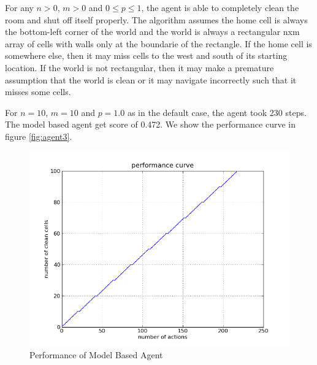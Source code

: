 For any $n>0$, $m>0$ and $0\le p \le1$, the agent is able to completely clean the room and shut off itself properly. The algorithm assumes the home cell is always the bottom-left corner of the world and the world is always a rectangular nxm array of cells with walls only at the boundarie of the rectangle. If the home cell is somewhere else, then it may miss cells to the west and south of its starting location. If the world is not rectangular, then it may make a premature assumption that the world is clean or it may navigate incorrectly such that it misses some cells.

For $n=10$, $m=10$ and $p=1.0$ as in the default case, the agent took 230 steps. The model based agent get score of 0.472. We show the performance curve in figure \ref{fig:agent3}.

\begin{figure}[!h]
\centering
\includegraphics[scale=.35]{img/agent3.png}
\caption{Performance of Model Based Agent}
\label{fig:agent1}
\end{figure}
